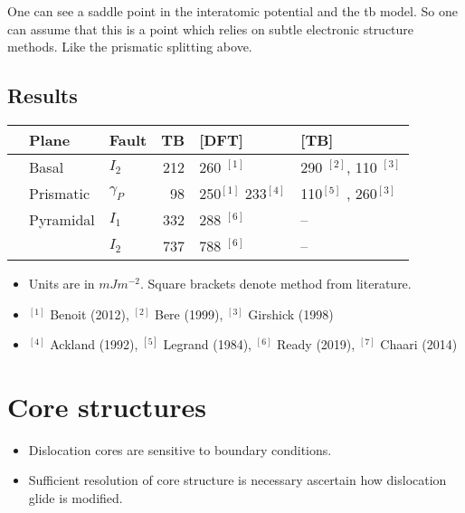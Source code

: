 \documentclass[11pt]{article}
\begin{document}
\begin{notes}


One can see a saddle point in the interatomic potential and the tb model. So
one can assume that this is a point which relies on subtle electronic
structure methods. Like the prismatic splitting above. 
\end{notes}

\subsection*{Results}
\label{sec:orgdc579d9}
\begin{center}
\begin{tabular}{lllrll}
 & Plane & Fault & TB & [DFT] & [TB]\\
\hline
 & Basal & \(I_{2}\) & 212 & 260 \(^{[1]}\) & 290 \(^{[2]}\), 110 \(^{[3]}\)\\
\hline
 & Prismatic & \(\gamma_{P}\) & 98 & 250\(^{[1]}\) 233\(^{[4]}\) & 110\(^{[5]}\) ,  260\(^{[3]}\)\\
\hline
 & Pyramidal & \(I_{1}\) & 332 & 288 \(^{[6]}\) & --\\
 &  & \(I_{2}\) & 737 & 788 \(^{[6]}\) & --\\
\end{tabular}
\end{center}


\begin{itemize}
\item Units are in \(mJm^{-2}\). Square brackets denote method from literature.
\item \(^{[1]}\) Benoit (2012), \(^{[2]}\) Bere (1999), \(^{[3]}\) Girshick (1998)
\item \(^{[4]}\) Ackland (1992), \(^{[5]}\) Legrand (1984), \(^{[6]}\) Ready (2019), \(^{[7]}\) Chaari (2014)
\end{itemize}




\section*{Core structures}
\label{sec:orgfb1888f}
\begin{itemize}
\item Dislocation cores are sensitive to boundary conditions.
\item Sufficient resolution of core structure is necessary ascertain how
dislocation glide is modified.
\end{itemize}
\end{document}
